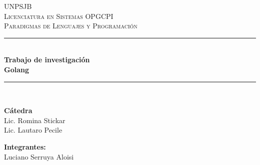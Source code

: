 \begin{titlepage}

    \newcommand{\HRule}{\rule{\linewidth}{0.5mm}} %

    \center %
     

    \textsc{\LARGE UNPSJB}\\[1cm] %
    \textsc{\Large Licenciatura en Sistemas OPGCPI}\\[0.5cm] %
    \textsc{\large Paradigmas de Lenguajes y Programación}\\[0.5cm] %


    \HRule \\[0.4cm]
    {\huge \bfseries Trabajo de investigación}\\[0.4cm] %
    {\large \bfseries Golang}\\[0.4cm] %
    \HRule \\[1.5cm]
     


    \begin{minipage}[l]{0.5\textwidth}
        \begin{flushleft}
            \textbf{\textsf{Cátedra}}\\
            \large Lic. Romina Stickar\\ 
            \large Lic. Lautaro Pecile\\ 
            \linespread{4}
            \end{flushleft}
    \end{minipage}
    \begin{minipage}[l]{0.4\textwidth}
        \begin{flushright}
            \textbf{\textsf{Integrantes:}}\\
            \linespread{1}
            \large Luciano Serruya Aloisi\\
        \end{flushright}
    \end{minipage}\\[1.5cm]


\end{titlepage}
